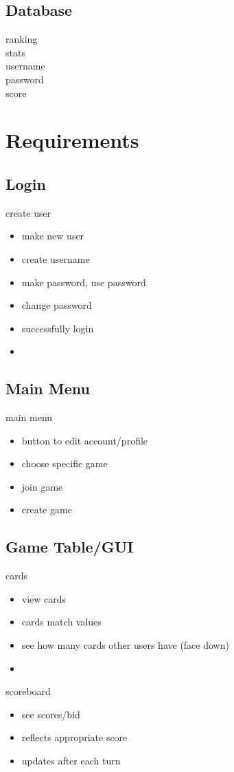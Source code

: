 \documentclass[11pt, titlepage]{article}
\begin{document}
		\subsection{Database}
			ranking\\
			stats\\
			username\\
			password\\
			score\\
	\section{Requirements}
	
		\subsection{Login}
			create user\\
			\begin{itemize}
				\item make new user
				\item create username
				\item make password, use password
				\item change password
				\item successfully login
				\item 
			\end{itemize}

		\subsection{Main Menu}
			main menu\\
				\begin{itemize}
					\item button to edit account/profile
					\item choose specific game
					\item join game
					\item create game
				\end{itemize}
			
		\subsection{Game Table/GUI}
			cards\\
			\begin{itemize}
				\item view  cards
				\item cards match values
				\item see how many cards other users have (face down)
				\item 
			\end{itemize}
			scoreboard
			\begin{itemize}
				\item see scores/bid
				\item reflects appropriate score
				\item updates after each turn
			\end{itemize}
			
\end{document}
